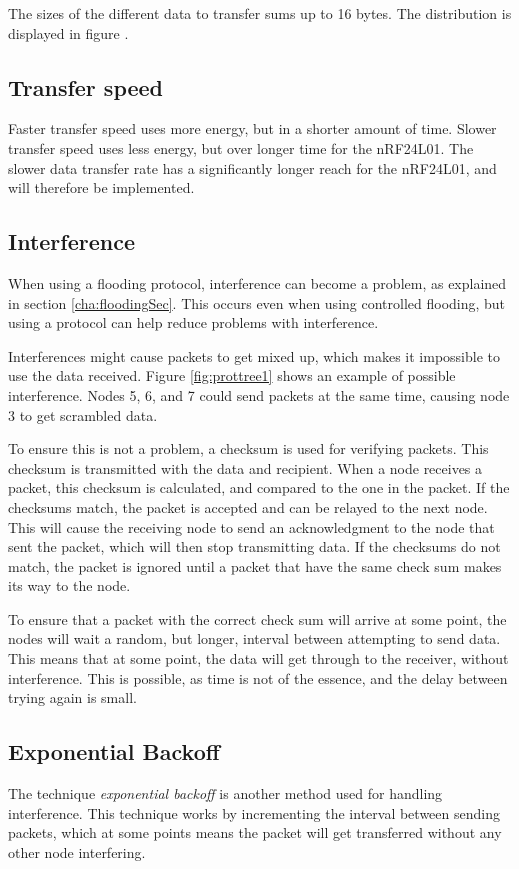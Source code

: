 The sizes of the different data to transfer sums up to 16 bytes. The distribution is displayed in figure .

\subsection{Transfer speed}
Faster transfer speed uses more energy, but in a shorter amount of time. Slower transfer speed uses less energy, but over longer time for the nRF24L01. The slower data transfer rate has a significantly longer reach for the nRF24L01, and will therefore be implemented. 

\subsection{Interference}
When using a flooding protocol, interference can become a problem, as explained in section \ref{cha:floodingSec}. This occurs even when using controlled flooding, but using a protocol can help reduce problems with interference.

Interferences might cause packets to get mixed up, which makes it impossible to use the data received. Figure \ref{fig:prottree1} shows an example of possible interference. Nodes 5, 6, and 7 could send packets at the same time, causing node 3 to get scrambled data.

To ensure this is not a problem, a checksum is used for verifying packets. This checksum is transmitted with the data and recipient. When a node receives a packet, this checksum is calculated, and compared to the one in the packet. If the checksums match, the packet is accepted and can be relayed to the next node. This will cause the receiving node to send an acknowledgment to the node that sent the packet, which will then stop transmitting data.
If the checksums do not match, the packet is ignored until a packet that have the same check sum makes its way to the node.

To ensure that a packet with the correct check sum will arrive at some point, the nodes will wait a random, but longer, interval between attempting to send data. This means that at some point, the data will get through to the receiver, without interference.
This is possible, as time is not of the essence, and the delay between trying again is small.

\subsection*{Exponential Backoff}\label{cha:expbackoff}
The technique \textit{exponential backoff} is another method used for handling interference. This technique works by incrementing the interval between sending packets, which at some points means the packet will get transferred without any other node interfering. 

